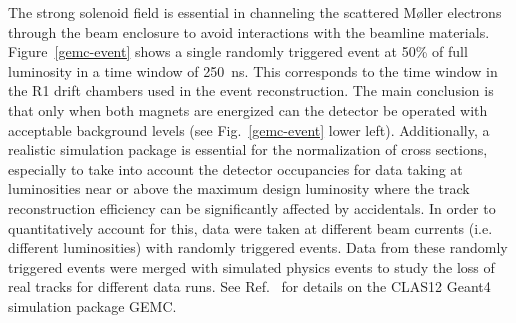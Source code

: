 \documentclass[final,3p,twocolumn]{elsarticle}
\begin{document}
The strong solenoid field is essential in channeling the scattered M{\o}ller electrons through the beam enclosure to
avoid interactions with the beamline materials. Figure~\ref{gemc-event} shows a single randomly triggered event at
50\% of full luminosity in a time window of 250~ns. This corresponds to the time window in the R1 drift chambers
used in the event reconstruction. The main conclusion is that only when both magnets are energized can the detector
be operated with acceptable background levels (see Fig.~\ref{gemc-event} lower left). Additionally, a realistic
simulation package is essential for the normalization of cross sections, especially to take into account the detector
occupancies for data taking at luminosities near or above the maximum design luminosity where the track reconstruction
efficiency can be significantly affected by accidentals. In order to quantitatively account for this, data were taken at
different beam currents (i.e. different luminosities) with randomly triggered events. Data from these randomly
triggered events were merged with simulated physics events to study the loss of real tracks for different data runs.
See Ref.~\cite{GEMC} for details on the CLAS12 Geant4 simulation package GEMC.
\end{document}

